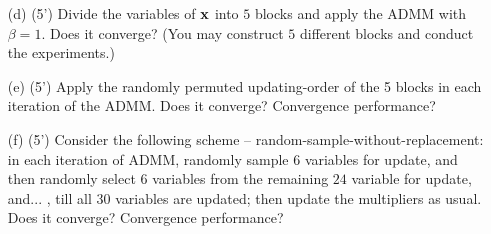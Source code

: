 \documentclass[12pt,letterpaper]{article}
\newcommand\x{{\bf x}}
\begin{document}
\begin{enumerate}
\begin{enumerate}
\item[(d)] (5') Divide the variables of $\x$ into $5$ blocks and apply the ADMM with $\beta=1$. Does it converge? (You may construct $5$ different  blocks and conduct the experiments.)

\item[(e)] (5') Apply the randomly permuted updating-order of the 5 blocks in each iteration of the ADMM. Does it converge? Convergence performance?

\item[(f)] (5') Consider the following scheme -- random-sample-without-replacement: in each iteration of ADMM, randomly sample $6$ variables for update, and then randomly select $6$ variables from the remaining $24$ variable for update, and... , till all $30$ variables are updated; then update the multipliers as usual. Does it converge? Convergence performance?
\end{enumerate}
\end{enumerate}
\end{document}

